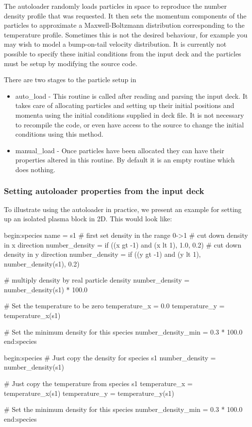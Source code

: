 The autoloader randomly loads particles in space to reproduce the number
density profile that was requested. It then sets the momentum components
of the particles to approximate a Maxwell-Boltzmann distribution
corresponding to the temperature profile. Sometimes this is not the
desired behaviour, for example you may wish to model a bump-on-tail
velocity distribution. It is currently not possible to specify these
initial conditions from the input deck and the particles must be setup
by modifying the source code.

There are two stages to the particle setup in {\EPOCH}

\begin{itemize}
\item auto\_load - This routine is called after reading and parsing the
  input deck. It takes care of allocating particles and setting up their
  initial positions and momenta using the initial conditions supplied in
  deck file.
  It is not necessary to recompile the code, or even have
  access to the source to change the initial conditions using this method.
\item manual\_load - Once particles have been allocated they can have their
  properties altered in this routine. By default it is an empty routine
  which does nothing.
\end{itemize}

\subsubsection{Setting autoloader properties from the input deck}
To illustrate using the autoloader in practice, we present an example for
setting up an isolated plasma block in 2D. This would look like:
\begin{boxverbatim}
begin:species
   name = s1
   # first set density in the range 0->1
   # cut down density in x direction
   number_density = if ((x gt -1) and (x lt 1), 1.0, 0.2)
   # cut down density in y direction
   number_density = if ((y gt -1) and (y lt 1), number_density(s1), 0.2)

   # multiply density by real particle density
   number_density = number_density(s1) * 100.0

   # Set the temperature to be zero
   temperature_x = 0.0
   temperature_y = temperature_x(s1)

   # Set the minimum density for this species
   number_density_min = 0.3 * 100.0
end:species

begin:species
   # Just copy the density for species s1
   number_density = number_density(s1)

   # Just copy the temperature from species s1
   temperature_x = temperature_x(s1)
   temperature_y = temperature_y(s1)

   # Set the minimum density for this species
   number_density_min = 0.3 * 100.0
end:species
\end{boxverbatim}

